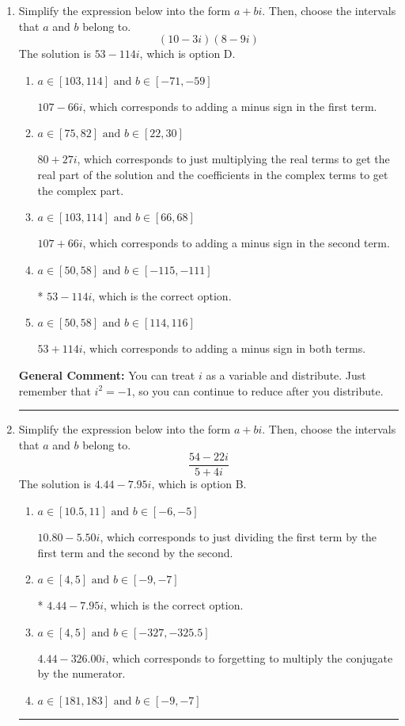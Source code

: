 \documentclass{extbook}[14pt]
\newcommand{\litem}[1]{\item #1

\rule{\textwidth}{0.4pt}}
\begin{document}
\begin{enumerate}\litem{
Simplify the expression below into the form $a+bi$. Then, choose the intervals that $a$ and $b$ belong to.
\[ (10 - 3 i)(8 - 9 i) \]The solution is \( 53 - 114 i \), which is option D.\begin{enumerate}[label=\Alph*.]
\item \( a \in [103, 114] \text{ and } b \in [-71, -59] \)

 $107 - 66 i$, which corresponds to adding a minus sign in the first term.
\item \( a \in [75, 82] \text{ and } b \in [22, 30] \)

 $80 + 27 i$, which corresponds to just multiplying the real terms to get the real part of the solution and the coefficients in the complex terms to get the complex part.
\item \( a \in [103, 114] \text{ and } b \in [66, 68] \)

 $107 + 66 i$, which corresponds to adding a minus sign in the second term.
\item \( a \in [50, 58] \text{ and } b \in [-115, -111] \)

* $53 - 114 i$, which is the correct option.
\item \( a \in [50, 58] \text{ and } b \in [114, 116] \)

 $53 + 114 i$, which corresponds to adding a minus sign in both terms.
\end{enumerate}

\textbf{General Comment:} You can treat $i$ as a variable and distribute. Just remember that $i^2=-1$, so you can continue to reduce after you distribute.
}
\litem{
Simplify the expression below into the form $a+bi$. Then, choose the intervals that $a$ and $b$ belong to.
\[ \frac{54 - 22 i}{5 + 4 i} \]The solution is \( 4.44  - 7.95 i \), which is option B.\begin{enumerate}[label=\Alph*.]
\item \( a \in [10.5, 11] \text{ and } b \in [-6, -5] \)

 $10.80  - 5.50 i$, which corresponds to just dividing the first term by the first term and the second by the second.
\item \( a \in [4, 5] \text{ and } b \in [-9, -7] \)

* $4.44  - 7.95 i$, which is the correct option.
\item \( a \in [4, 5] \text{ and } b \in [-327, -325.5] \)

 $4.44  - 326.00 i$, which corresponds to forgetting to multiply the conjugate by the numerator.
\item \( a \in [181, 183] \text{ and } b \in [-9, -7] \)


\end{enumerate}}
\end{enumerate}
\end{document}
